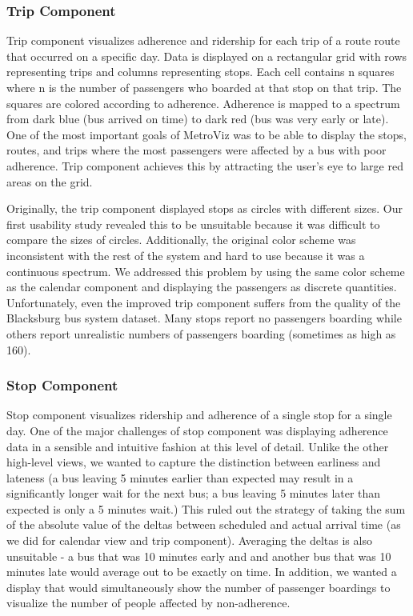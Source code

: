 \documentclass[journal]{vgtc}                %
\begin{document}
\subsubsection{Trip Component}
Trip component visualizes adherence and ridership for each trip of a route route that occurred on a specific day. Data is displayed on a rectangular grid with rows representing trips and columns representing stops. Each cell contains n squares where n is the number of passengers who boarded at that stop on that trip. The squares are colored according to adherence. Adherence is mapped to a spectrum from dark blue (bus arrived on time) to dark red (bus was very early or late). One of the most important goals of MetroViz was to be able to display the stops, routes, and trips where the most passengers were affected by a bus with poor adherence. Trip component achieves this by attracting the user's eye to large red areas on the grid.

Originally, the trip component displayed stops as circles with different sizes. Our first usability study revealed this to be unsuitable because it was difficult to compare the sizes of circles. Additionally, the original color scheme was inconsistent with the rest of the system and hard to use because it was a continuous spectrum. We addressed this problem by using the same color scheme as the calendar component and displaying the passengers as discrete quantities. Unfortunately, even the improved trip component suffers from the quality of the Blacksburg bus system dataset. Many stops report no passengers boarding while others report unrealistic numbers of passengers boarding (sometimes as high as 160).

\subsubsection{Stop Component}
Stop component visualizes ridership and adherence of a single stop for a single day. One of the major challenges of stop component was displaying adherence data in a sensible and intuitive fashion at this level of detail. Unlike the other high-level views, we wanted to capture the distinction between earliness and lateness (a bus leaving 5 minutes earlier than expected may result in a significantly longer wait for the next bus; a bus leaving 5 minutes later than expected is only a 5 minutes wait.) This ruled out the strategy of taking the sum of the absolute value of the deltas between scheduled and actual arrival time (as we did for calendar view and trip component). Averaging the deltas is also unsuitable - a bus that was 10 minutes early and and another bus that was 10 minutes late would average out to be exactly on time. In addition, we wanted a display that would simultaneously show the number of passenger boardings to visualize the number of people affected by non-adherence.
\end{document}
